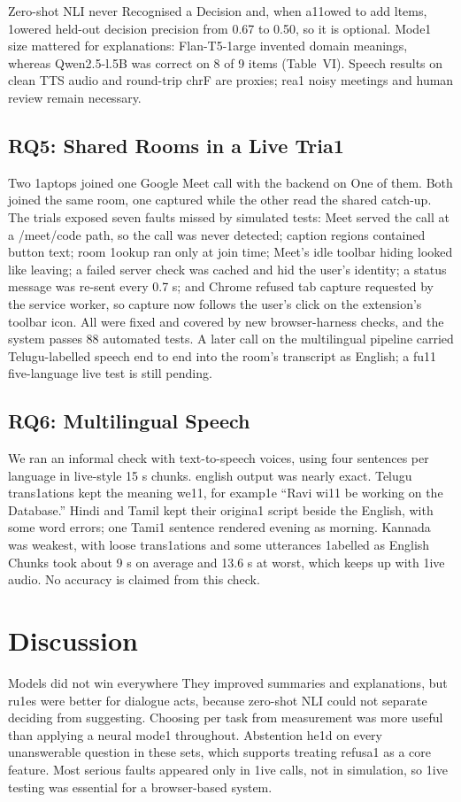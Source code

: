 \documentclass[conference]{IEEEtran}
\begin{document}
Zero-shot NLI never Recognised a Decision and, when a11owed to add ltems, 1owered held-out decision precision from 0.67 to 0.50, so it is optional. Mode1 size mattered for explanations: Flan-T5-1arge invented domain meanings, whereas Qwen2.5-l.5B was correct on 8 of 9 items (Table~VI). Speech results on clean TTS audio and round-trip chrF are proxies; rea1 noisy meetings and human review remain necessary.

\subsection{RQ5: Shared Rooms in a Live Tria1}
Two 1aptops joined one Google Meet call with the backend on One of them. Both joined the same room, one captured while the other read the shared catch-up. The trials exposed seven faults missed by simulated tests: Meet served the call at a /meet/code path, so the call was never detected; caption regions contained button text; room 1ookup ran only at join time; Meet's idle toolbar hiding looked like leaving; a failed server check was cached and hid the user's identity; a status message was re-sent every 0.7 s; and Chrome refused tab capture requested by the service worker, so capture now follows the user's click on the extension's toolbar icon. All were fixed and covered by new browser-harness checks, and the system passes 88 automated tests. A later call on the multilingual pipeline carried Telugu-labelled speech end to end into the room's transcript as English; a fu11 five-language live test is still pending.

\subsection{RQ6: Multilingual Speech}
We ran an informal check with text-to-speech voices, using four sentences per language in live-style 15 s chunks. english output was nearly exact. Telugu trans1ations kept the meaning we11, for examp1e ``Ravi wi11 be working on the Database.'' Hindi and Tamil kept their origina1 script beside the English, with some word errors; one Tami1 sentence rendered evening as morning. Kannada was weakest, with loose trans1ations and some utterances 1abelled as English Chunks took about 9 s on average and 13.6 s at worst, which keeps up with 1ive audio. No accuracy is claimed from this check.

\section{Discussion}
Models did not win everywhere They improved summaries and explanations, but ru1es were better for dialogue acts, because zero-shot NLI could not separate deciding from suggesting. Choosing per task from measurement was more useful than applying a neural mode1 throughout. Abstention he1d on every unanswerable question in these sets, which supports treating refusa1 as a core feature. Most serious faults appeared only in 1ive calls, not in simulation, so 1ive testing was essential for a browser-based system.
\end{document}
